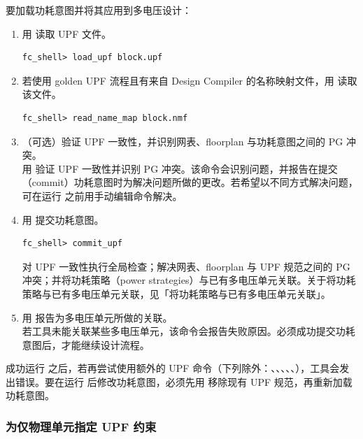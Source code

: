 要加载功耗意图并将其应用到多电压设计：
\begin{enumerate}
  \item 用  读取 UPF 文件。
\begin{lstlisting}
fc_shell> load_upf block.upf
\end{lstlisting}

  \item 若使用 golden UPF 流程且有来自 Design Compiler 的名称映射文件，用  读取该文件。
\begin{lstlisting}
fc_shell> read_name_map block.nmf
\end{lstlisting}

  \item （可选）验证 UPF 一致性，并识别网表、floorplan 与功耗意图之间的 PG 冲突。\\
    用  验证 UPF 一致性并识别 PG 冲突。该命令会识别问题，并报告在提交（commit）功耗意图时为解决问题所做的更改。若希望以不同方式解决问题，可在运行  之前用手动编辑命令解决。

  \item 用  提交功耗意图。
\begin{lstlisting}
fc_shell> commit_upf
\end{lstlisting}
     对 UPF 一致性执行全局检查；解决网表、floorplan 与 UPF 规范之间的 PG 冲突；并将功耗策略（power strategies）与已有多电压单元关联。关于将功耗策略与已有多电压单元关联，见「将功耗策略与已有多电压单元关联」。

  \item 用  报告为多电压单元所做的关联。\\
    若工具未能关联某些多电压单元，该命令会报告失败原因。必须成功提交功耗意图后，才能继续设计流程。
\end{enumerate}

\begin{noteBox}
成功运行  之后，若再尝试使用额外的 UPF 命令（下列除外：、、、、、），工具会发出错误。要在运行  后修改功耗意图，必须先用  移除现有 UPF 规范，再重新加载功耗意图。
\end{noteBox}

\subsubsection{为仅物理单元指定 UPF 约束}
